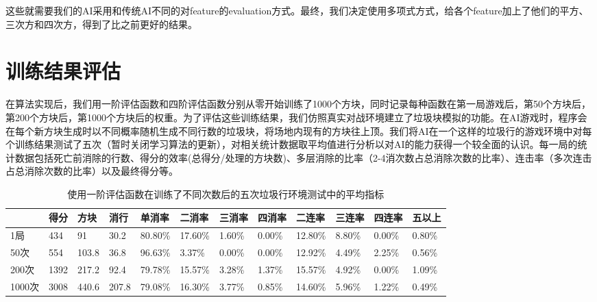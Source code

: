 \documentclass[10pt,UTF8]{article}
\begin{document}
\begin{multicols}{2}
这些就需要我们的AI采用和传统AI不同的对feature的evaluation方式。最终，我们决定使用多项式方式，给各个feature加上了他们的平方、三次方和四次方，得到了比之前更好的结果。

\section{训练结果评估}

在算法实现后，我们用一阶评估函数和四阶评估函数分别从零开始训练了1000个方块，同时记录每种函数在第一局游戏后，第50个方块后，第200个方块后，第1000个方块后的权重。为了评估这些训练结果，我们仿照真实对战环境建立了垃圾块模拟的功能。在AI游戏时，程序会在每个新方块生成时以不同概率随机生成不同行数的垃圾块，将场地内现有的方块往上顶。我们将AI在一个这样的垃圾行的游戏环境中对每个训练结果测试了五次（暂时关闭学习算法的更新），对相关统计数据取平均值进行分析以对AI的能力获得一个较全面的认识。每一局的统计数据包括死亡前消除的行数、得分的效率(总得分/处理的方块数)、多层消除的比率（2-4消次数占总消除次数的比率）、连击率（多次连击占总消除次数的比率）以及最终得分等。


\end{multicols}
\begin{table}[h]
    \centering
    \caption{使用一阶评估函数在训练了不同次数后的五次垃圾行环境测试中的平均指标}
    \begin{tabular}{@{}llllllllllll@{}}
    \toprule
          & 得分   & 方块    & 消行    & 单消率     & 二消率     & 三消率    & 四消率    & 二连率     & 三连率    & 四连率    & 五以上    \\ \midrule
    1局    & 434  & 91    & 30.2  & 80.80\% & 17.60\% & 1.60\% & 0.00\% & 12.80\% & 8.80\% & 0.00\% & 0.80\% \\
    50次   & 554  & 103.8 & 36.8  & 96.63\% & 3.37\%  & 0.00\% & 0.00\% & 12.92\% & 4.49\% & 2.25\% & 0.56\% \\
    200次  & 1392 & 217.2 & 92.4  & 79.78\% & 15.57\% & 3.28\% & 1.37\% & 15.57\% & 4.92\% & 0.00\% & 1.09\% \\
    1000次 & 3008 & 440.6 & 207.8 & 79.08\% & 16.30\% & 3.77\% & 0.85\% & 14.60\% & 5.96\% & 1.22\% & 0.49\% \\ \bottomrule
    \end{tabular}
\end{table}
\end{document}
